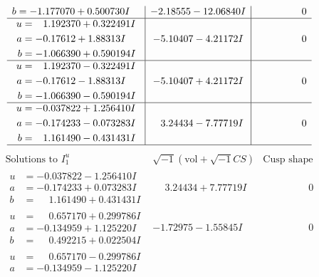 \documentclass[1p]{elsarticle_modified}
\theoremstyle{definition}
\newcommand{\I}{\sqrt{-1}}
\begin{document}
$$\begin{array}{c|c|c}
\begin{aligned}
b &= -1.177070 + 0.500730 I\end{aligned}
 & -2.18555 - 12.06840 I & \phantom{-0.000000 } 0 \\ \hline\begin{aligned}
u &= \phantom{-}1.192370 + 0.322491 I \\
a &= -0.17612 + 1.88313 I \\
b &= -1.066390 + 0.590194 I\end{aligned}
 & -5.10407 - 4.21172 I & \phantom{-0.000000 } 0 \\ \hline\begin{aligned}
u &= \phantom{-}1.192370 - 0.322491 I \\
a &= -0.17612 - 1.88313 I \\
b &= -1.066390 - 0.590194 I\end{aligned}
 & -5.10407 + 4.21172 I & \phantom{-0.000000 } 0 \\ \hline\begin{aligned}
u &= -0.037822 + 1.256410 I \\
a &= -0.174233 - 0.073283 I \\
b &= \phantom{-}1.161490 - 0.431431 I\end{aligned}
 & \phantom{-}3.24434 - 7.77719 I & \phantom{-0.000000 } 0\\
 \hline 
 \end{array}$$\newpage$$\begin{array}{c|c|c}  
\text{Solutions to }I^u_{1}& \I (\text{vol} + \sqrt{-1}CS) & \text{Cusp shape}\\
 \hline 
\begin{aligned}
u &= -0.037822 - 1.256410 I \\
a &= -0.174233 + 0.073283 I \\
b &= \phantom{-}1.161490 + 0.431431 I\end{aligned}
 & \phantom{-}3.24434 + 7.77719 I & \phantom{-0.000000 } 0 \\ \hline\begin{aligned}
u &= \phantom{-}0.657170 + 0.299786 I \\
a &= -0.134959 + 1.125220 I \\
b &= \phantom{-}0.492215 + 0.022504 I\end{aligned}
 & -1.72975 - 1.55845 I & \phantom{-0.000000 } 0 \\ \hline\begin{aligned}
u &= \phantom{-}0.657170 - 0.299786 I \\
a &= -0.134959 - 1.125220 I \\

\end{aligned}
\end{array}$$
\end{document}
